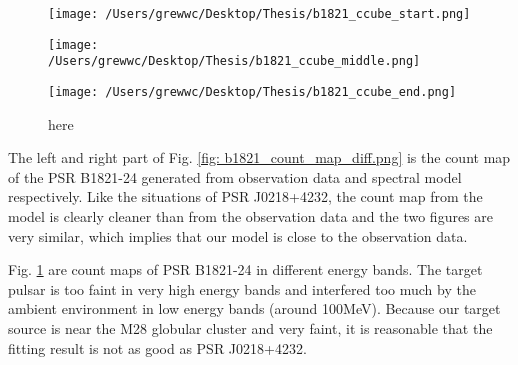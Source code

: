 \documentclass[12pt]{report}
\newcommand{\mycaption}[1]{\protect \caption{#1}}
\begin{document}
              \begin{figure}[!ht]
                \begin{center}
                \begin{minipage}{0.32\textwidth}
                  \begin{center} 
                    \texttt{[image: /Users/grewwc/Desktop/Thesis/b1821\_ccube\_start.png]}
                  \end{center}
                \end{minipage}
                \begin{minipage}{0.32\textwidth}
                  \begin{center}
                    \texttt{[image: /Users/grewwc/Desktop/Thesis/b1821\_ccube\_middle.png]}
                  \end{center}
                \end{minipage}
                \begin{minipage}{0.32\textwidth}
                  \begin{center}
                  \texttt{[image: /Users/grewwc/Desktop/Thesis/b1821\_ccube\_end.png]}
                  \end{center}
                \end{minipage}
              \end{center}
              \caption{here}
              \label{fig: b1821_ccube_1_15_33.png}
              \end{figure}

              The left and right part of Fig. \ref{fig: b1821_count_map_diff.png} is the count 
              map of the PSR B1821-24 generated from observation data and spectral model respectively. 
              Like the situations of PSR J0218+4232, the count map from the model is clearly cleaner than 
              from the observation data and the two figures are very similar, which implies that our model 
              is close to the observation data. 

              Fig. \ref{fig: b1821_ccube_1_15_33.png} are count maps of PSR B1821-24 in different energy 
              bands. The target pulsar is too faint in very high energy bands and interfered too much by the ambient 
              environment in low energy bands (around 100MeV). Because our target source is near the M28 globular 
              cluster and very faint, it is reasonable that the fitting result is not as good as PSR J0218+4232. 
\end{document}
